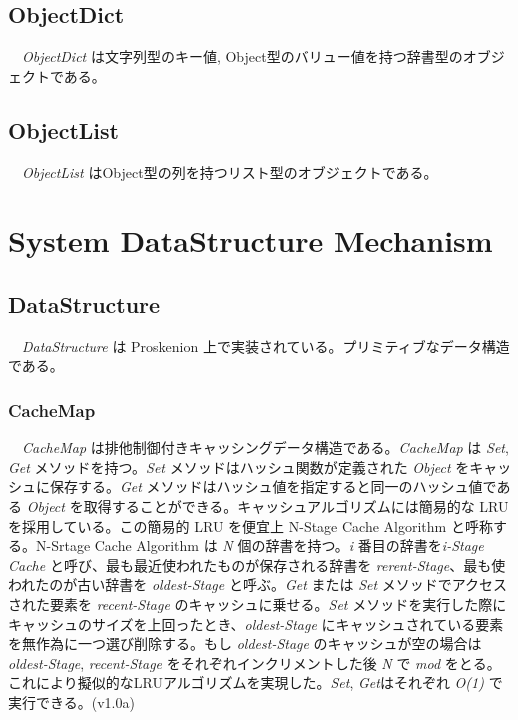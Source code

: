 \hypertarget{objectdict}{%
\subsection{ObjectDict}\label{objectdict}}

　\emph{ObjectDict} は文字列型のキー値,
Object型のバリュー値を持つ辞書型のオブジェクトである。

\hypertarget{objectlist}{%
\subsection{ObjectList}\label{objectlist}}

　\emph{ObjectList} はObject型の列を持つリスト型のオブジェクトである。

\hypertarget{system-datastructure-mechanism}{%
\section{System DataStructure
Mechanism}\label{system-datastructure-mechanism}}

\hypertarget{datastructure}{%
\subsection{DataStructure}\label{datastructure}}

　\emph{DataStructure} は Proskenion
上で実装されている。プリミティブなデータ構造である。

\hypertarget{cachemap}{%
\subsubsection{CacheMap}\label{cachemap}}

　\emph{CacheMap}
は排他制御付きキャッシングデータ構造である。\emph{CacheMap} は
\emph{Set}, \emph{Get} メソッドを持つ。\emph{Set}
メソッドはハッシュ関数が定義された \emph{Object}
をキャッシュに保存する。\emph{Get}
メソッドはハッシュ値を指定すると同一のハッシュ値である \emph{Object}
を取得することができる。キャッシュアルゴリズムには簡易的な LRU
を採用している。この簡易的 LRU を便宜上 N-Stage Cache Algorithm
と呼称する。N-Srtage Cache Algorithm は \emph{N}
個の辞書を持つ。\emph{i} 番目の辞書を\emph{i-Stage Cache}
と呼び、最も最近使われたものが保存される辞書を
\emph{rerent-Stage}、最も使われたのが古い辞書を \emph{oldest-Stage}
と呼ぶ。\emph{Get} または \emph{Set} メソッドでアクセスされた要素を
\emph{recent-Stage} のキャッシュに乗せる。\emph{Set}
メソッドを実行した際にキャッシュのサイズを上回ったとき、\emph{oldest-Stage}
にキャッシュされている要素を無作為に一つ選び削除する。もし
\emph{oldest-Stage} のキャッシュが空の場合は \emph{oldest-Stage},
\emph{recent-Stage} をそれぞれインクリメントした後 \emph{N} で
\emph{mod}
をとる。これにより擬似的なLRUアルゴリズムを実現した。\emph{Set},
\emph{Get}はそれぞれ \emph{O(1)} で実行できる。(v1.0a)

